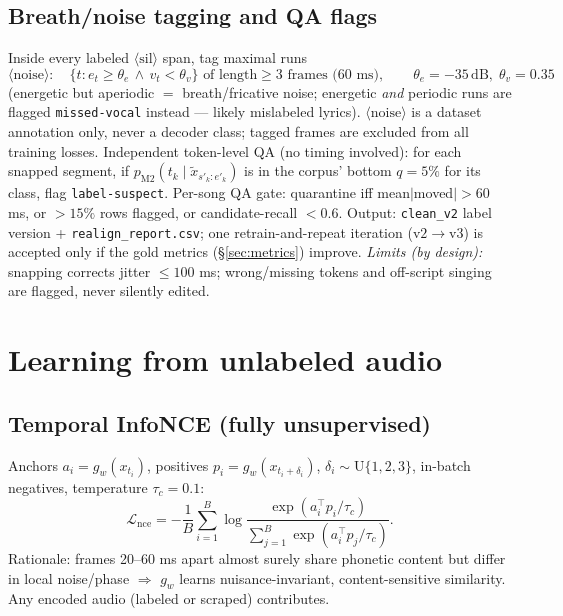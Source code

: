 \documentclass[10pt]{article}
\newcommand{\sil}{\langle\mathrm{sil}\rangle}
\newcommand{\noise}{\langle\mathrm{noise}\rangle}
\begin{document}
\subsection{Breath/noise tagging and QA flags}
Inside every labeled $\sil$ span, tag maximal runs
\begin{equation}
\noise: \quad \{t : e_t \ge \theta_e \,\wedge\, v_t < \theta_v\} \text{ of length} \ge 3 \text{ frames (60 ms)},
\qquad \theta_e = -35\,\mathrm{dB},\; \theta_v = 0.35
\end{equation}
(energetic but aperiodic $=$ breath/fricative noise; energetic \emph{and} periodic runs are flagged \texttt{missed-vocal} instead --- likely mislabeled lyrics). $\noise$ is a dataset annotation only, never a decoder class; tagged frames are excluded from all training losses. Independent token-level QA (no timing involved): for each snapped segment, if $p_{\mathrm{M2}}(t_k \mid \tilde x_{s'_k:e'_k})$ is in the corpus' bottom $q = 5\%$ for its class, flag \texttt{label-suspect}. Per-song QA gate: quarantine iff mean$|$moved$| > 60$ ms, or $>15\%$ rows flagged, or candidate-recall $< 0.6$. Output: \texttt{clean\_v2} label version + \texttt{realign\_report.csv}; one retrain-and-repeat iteration ($\mathrm{v2} \to \mathrm{v3}$) is accepted only if the gold metrics (\S\ref{sec:metrics}) improve. \emph{Limits (by design):} snapping corrects jitter $\le 100$ ms; wrong/missing tokens and off-script singing are flagged, never silently edited.

\section{Learning from unlabeled audio}\label{sec:unsup}

\subsection{Temporal InfoNCE (fully unsupervised)}
Anchors $a_i = g_w(x_{t_i})$, positives $p_i = g_w(x_{t_i + \delta_i})$, $\delta_i \sim \mathrm{U}\{1,2,3\}$, in-batch negatives, temperature $\tau_c = 0.1$:
\begin{equation}
\mathcal{L}_{\mathrm{nce}} = -\frac{1}{B}\sum_{i=1}^{B} \log \frac{\exp(a_i^\top p_i / \tau_c)}{\sum_{j=1}^{B} \exp(a_i^\top p_j / \tau_c)}.
\end{equation}
Rationale: frames 20--60 ms apart almost surely share phonetic content but differ in local noise/phase $\Rightarrow$ $g_w$ learns nuisance-invariant, content-sensitive similarity. Any encoded audio (labeled or scraped) contributes.
\end{document}
